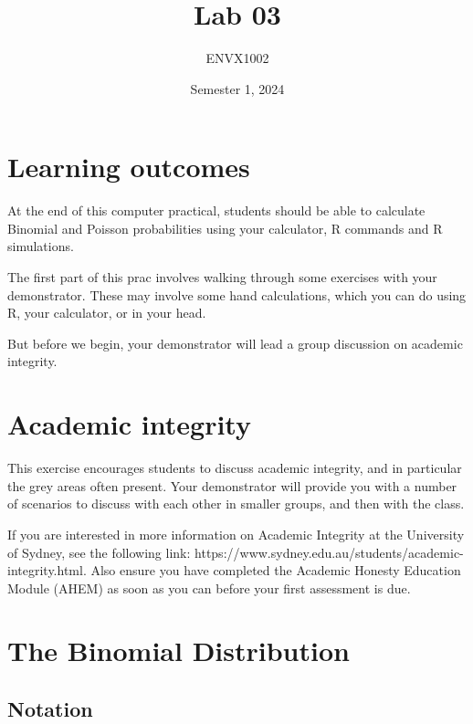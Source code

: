 \documentclass[
  10pt,
  letterpaper,
  DIV=11,
  numbers=noendperiod]{scrartcl}
\title{Lab 03}
\subtitle{ENVX1002}
\author{}
\date{Semester 1, 2024}
\makeatletter
\renewcommand{\maketitle}{\bgroup\setlength{\parindent}{0pt}
\begin{flushleft}
  {\sffamily\huge\textbf{\MakeUppercase{\@title}}} \vspace{0.3cm} \newline
  {\Large {\@subtitle}} \newline
  \@author
\end{flushleft}\egroup
}
\renewcommand*\contentsname{Table of contents}
\newcommand\contentsname{Table of contents}
\makeatother
\begin{document}
\maketitle

\pagestyle{usyd}

\renewcommand*\contentsname{Table of contents}
{
\hypersetup{linkcolor=}
\setcounter{tocdepth}{3}
\tableofcontents
}
\section{Learning outcomes}\label{learning-outcomes}

At the end of this computer practical, students should be able to
calculate Binomial and Poisson probabilities using your calculator, R
commands and R simulations.

The first part of this prac involves walking through some exercises with
your demonstrator. These may involve some hand calculations, which you
can do using R, your calculator, or in your head.

But before we begin, your demonstrator will lead a group discussion on
academic integrity.

\section{Academic integrity}\label{academic-integrity}

This exercise encourages students to discuss academic integrity, and in
particular the grey areas often present. Your demonstrator will provide
you with a number of scenarios to discuss with each other in smaller
groups, and then with the class.

If you are interested in more information on Academic Integrity at the
University of Sydney, see the following link:
https://www.sydney.edu.au/students/academic-integrity.html. Also ensure
you have completed the Academic Honesty Education Module (AHEM) as soon
as you can before your first assessment is due.

\section{The Binomial Distribution}\label{the-binomial-distribution}

\subsection{Notation}\label{notation}
\end{document}
